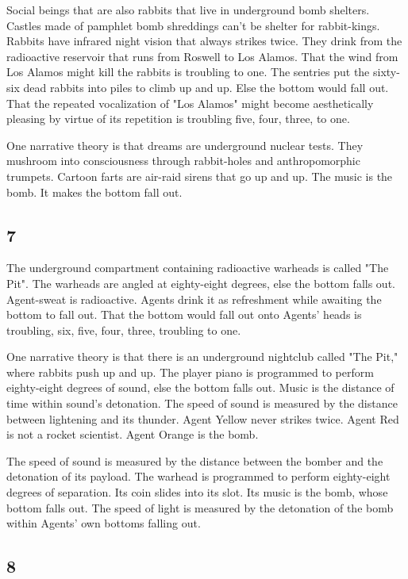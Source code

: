 Social beings that are also rabbits that live in underground bomb
shelters. Castles made of pamphlet bomb shreddings can't be shelter for
rabbit-kings. Rabbits have infrared night vision that always strikes
twice. They drink from the radioactive reservoir that runs from Roswell
to Los Alamos. That the wind from Los Alamos might kill the rabbits is
troubling to one. The sentries put the sixty-six dead rabbits into piles
to climb up and up. Else the bottom would fall out. That the repeated
vocalization of "Los Alamos" might become aesthetically pleasing by
virtue of its repetition is troubling five, four, three, to one.

One narrative theory is that dreams are underground nuclear tests. They
mushroom into consciousness through rabbit-holes and anthropomorphic
trumpets. Cartoon farts are air-raid sirens that go up and up. The music
is the bomb. It makes the bottom fall out.

\hypertarget{section-8}{%
\subsection{7}\label{section-8}}

The underground compartment containing radioactive warheads is called
"The Pit". The warheads are angled at eighty-eight degrees, else the
bottom falls out. Agent-sweat is radioactive. Agents drink it as
refreshment while awaiting the bottom to fall out. That the bottom would
fall out onto Agents' heads is troubling, six, five, four, three,
troubling to one.

One narrative theory is that there is an underground nightclub called
"The Pit," where rabbits push up and up. The player piano is programmed
to perform eighty-eight degrees of sound, else the bottom falls out.
Music is the distance of time within sound's detonation. The speed of
sound is measured by the distance between lightening and its thunder.
Agent Yellow never strikes twice. Agent Red is not a rocket scientist.
Agent Orange is the bomb.

The speed of sound is measured by the distance between the bomber and
the detonation of its payload. The warhead is programmed to perform
eighty-eight degrees of separation. Its coin slides into its slot. Its
music is the bomb, whose bottom falls out. The speed of light is
measured by the detonation of the bomb within Agents' own bottoms
falling out.

\hypertarget{section-9}{%
\subsection{8}\label{section-9}}

